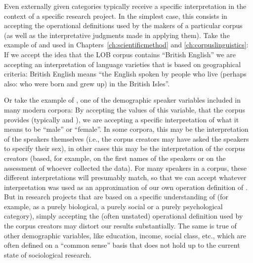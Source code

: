 Even externally given categories  typically receive a specific interpretation in the context of a specific research project. In the simplest case, this consists in accepting the operational  definitions used by the makers of a particular corpus (as well as the interpretative judgments made in applying them). Take the example of  and  used in Chapters~\ref{ch:scientificmethod} and \ref{ch:corpuslinguistics}: If we accept the idea that the LOB  corpus contains ``British  English'' we are accepting an interpretation of language varieties  that is based on geographical criteria: British English means ``the English spoken by people who live (perhaps also: who were born and grew up) in the British Isles''.

Or take the example of , one of the demographic  speaker variables included in many modern corpora: By accepting the values of this variable, that the corpus provides (typically  and ), we are accepting a specific interpretation of what it means to be ``male'' or ``female''. In some corpora, this may be the interpretation of the speakers themselves (i.e., the corpus creators may have asked the speakers to specify their sex), in other cases this may be the interpretation of the corpus creators (based, for example, on the first names of the speakers or on the assessment of whoever collected the data). For many speakers in a corpus, these different interpretations will presumably match, so that we can accept whatever interpretation was used as an approximation of our own operation definition of . But in research projects that are based on a specific understanding of  (for example, as a purely biological, a purely social or a purely psychological  category), simply accepting the (often unstated) operational  definition used by the corpus creators may distort our results substantially. The same is true of other demographic  variables, like education, income, social class, etc., which are often defined on a ``common sense'' basis that does not hold up to the current state of sociological research.

